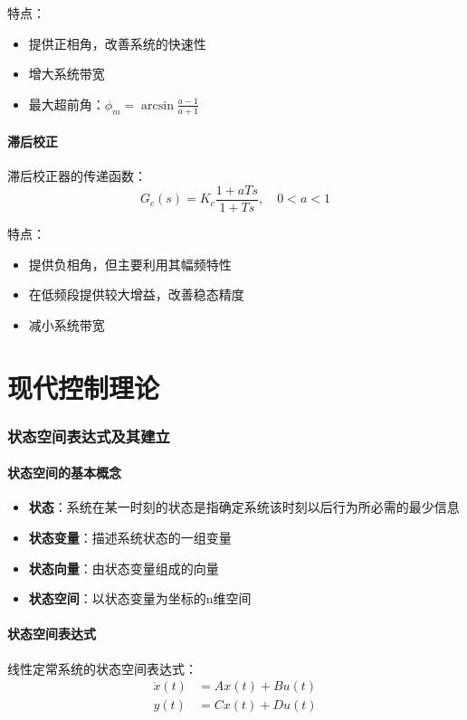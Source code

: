 \documentclass[12pt,a4paper]{article}
\begin{document}
特点：
\begin{itemize}
    \item 提供正相角，改善系统的快速性
    \item 增大系统带宽
    \item 最大超前角：$\phi_m = \arcsin\frac{a-1}{a+1}$
\end{itemize}

\subsection{滞后校正}
滞后校正器的传递函数：
\[G_c(s) = K_c \frac{1 + aTs}{1 + Ts}, \quad 0 < a < 1\]

特点：
\begin{itemize}
    \item 提供负相角，但主要利用其幅频特性
    \item 在低频段提供较大增益，改善稳态精度
    \item 减小系统带宽
\end{itemize}

\newpage
\part{现代控制理论}

\section{状态空间表达式及其建立}

\subsection{状态空间的基本概念}
\begin{itemize}
    \item \textbf{状态}：系统在某一时刻的状态是指确定系统该时刻以后行为所必需的最少信息
    \item \textbf{状态变量}：描述系统状态的一组变量
    \item \textbf{状态向量}：由状态变量组成的向量
    \item \textbf{状态空间}：以状态变量为坐标的n维空间
\end{itemize}

\subsection{状态空间表达式}
线性定常系统的状态空间表达式：
\begin{align}
\dot{x}(t) &= Ax(t) + Bu(t) \\
y(t) &= Cx(t) + Du(t)
\end{align}
\end{document}
